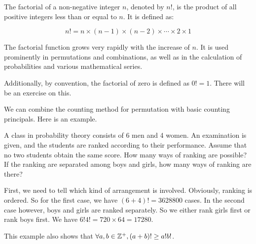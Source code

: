         \begin{notation}[Factorial($!$)]
            The factorial of a non-negative integer \( n \), denoted by \( n! \), is the product of all positive integers less than or equal to \( n \). It is defined as:

            $$
            n! = n \times (n-1) \times (n-2) \times \cdots \times 2 \times 1
            $$

            The factorial function grows very rapidly with the increase of \( n \). It is used prominently in permutations and combinations, as well as in the calculation of probabilities and various mathematical series.
            
            Additionally, by convention, the factorial of zero is defined as \( 0! = 1 \).
            There will be an exercise on this.
        \end{notation}

        We can combine the counting method for permutation with basic counting principals.
        Here is an example.
        \begin{example}
        A class in probability theory consists of 6 men and 4 women. An examination is
        given, and the students are ranked according to their performance. Assume that no
        two students obtain the same score. How many ways of ranking are possible?
        If the ranking are separated among boys and girls, how many ways of ranking are
        there?
        \begin{solution}
            First, we need to tell which kind of arrangement is involved. Obviously,
            ranking is ordered.
            So for the first case, we have $(6+4)! = 3628800$ cases.
            In the second case however, boys and girls are ranked separately. So we 
            either rank girls first or rank boys first. We have $6!4! = 720\times 64 =17280$.
        \end{solution}
        \begin{remark}
            This example also shows that \(\forall a,b\in \mathbb{Z}^+, (a+b)! \geq a!b!\).
        \end{remark}
        \end{example}
        

